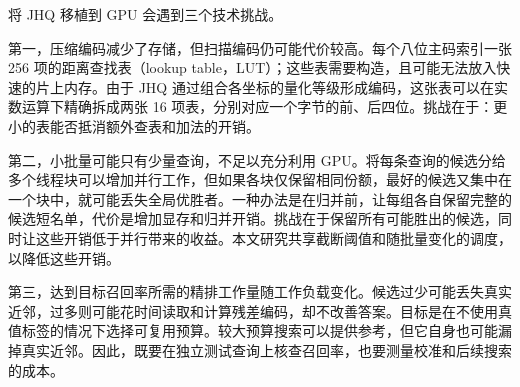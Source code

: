 将 JHQ 移植到 GPU 会遇到三个技术挑战。

第一，压缩编码减少了存储，但扫描编码仍可能代价较高。每个八位主码索引一张 256 项的距离查找表（lookup table，LUT）；这些表需要构造，且可能无法放入快速的片上内存。由于 JHQ 通过组合各坐标的量化等级形成编码，这张表可以在实数运算下精确拆成两张 16 项表，分别对应一个字节的前、后四位。挑战在于：更小的表能否抵消额外查表和加法的开销。

第二，小批量可能只有少量查询，不足以充分利用 GPU。将每条查询的候选分给多个线程块可以增加并行工作，但如果各块仅保留相同份额，最好的候选又集中在一个块中，就可能丢失全局优胜者。一种办法是在归并前，让每组各自保留完整的候选短名单，代价是增加显存和归并开销。挑战在于保留所有可能胜出的候选，同时让这些开销低于并行带来的收益。本文研究共享截断阈值和随批量变化的调度，以降低这些开销。

第三，达到目标召回率所需的精排工作量随工作负载变化。候选过少可能丢失真实近邻，过多则可能花时间读取和计算残差编码，却不改善答案。目标是在不使用真值标签的情况下选择可复用预算。较大预算搜索可以提供参考，但它自身也可能漏掉真实近邻。因此，既要在独立测试查询上核查召回率，也要测量校准和后续搜索的成本。
